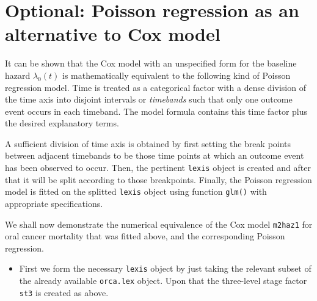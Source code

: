 \documentclass[
]{book}
\newenvironment{Shaded}{\begin{snugshade}}{\end{snugshade}}
\newcommand{\DecValTok}[1]{\textcolor[rgb]{0.00,0.00,0.81}{#1}}
\newcommand{\FunctionTok}[1]{\textcolor[rgb]{0.13,0.29,0.53}{\textbf{#1}}}
\newcommand{\NormalTok}[1]{#1}
\newcommand{\OtherTok}[1]{\textcolor[rgb]{0.56,0.35,0.01}{#1}}
\newcommand{\SpecialCharTok}[1]{\textcolor[rgb]{0.81,0.36,0.00}{\textbf{#1}}}
\newcommand{\StringTok}[1]{\textcolor[rgb]{0.31,0.60,0.02}{#1}}
\providecommand{\tightlist}{%
  \setlength{\itemsep}{0pt}\setlength{\parskip}{0pt}}
\begin{document}
\section{Optional: Poisson regression as an alternative to Cox model}\label{optional-poisson-regression-as-an-alternative-to-cox-model}

It can be shown that the Cox model with an unspecified form for the
baseline hazard \(\lambda_0(t)\) is mathematically equivalent
to the following kind of Poisson regression model.
Time is treated as a categorical factor with
a dense division of the time axis
into disjoint intervals or \emph{timebands} such that
only one outcome event occurs in each timeband.
The model formula contains this time factor plus the desired
explanatory terms.

A sufficient division of time axis is obtained by
first setting the break points
between adjacent timebands to be those time points at which an outcome event has been observed to occur. Then,
the pertinent \texttt{lexis} object is created
and after that it will be split according to those breakpoints.
Finally, the Poisson regression model is fitted
on the splitted \texttt{lexis} object using function \texttt{glm()} with appropriate specifications.

We shall now demonstrate the numerical equivalence of the Cox model
\texttt{m2haz1} for oral cancer mortality that was fitted above,
and the corresponding Poisson regression.

\begin{itemize}
\tightlist
\item
  First we form the necessary \texttt{lexis} object by just taking
  the relevant subset of the already available \texttt{orca.lex} object.
  Upon that the three-level stage factor \texttt{st3} is created
  as above.
\end{itemize}

\begin{Shaded}
\end{Shaded}
\end{document}

